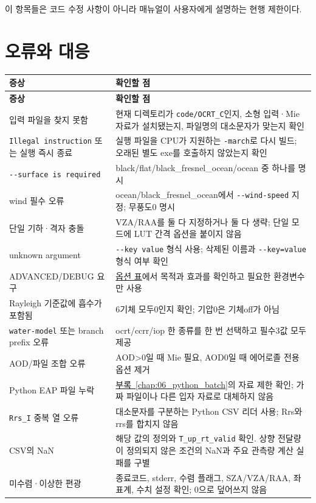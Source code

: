 이 항목들은 코드 수정 사항이 아니라 매뉴얼이 사용자에게 설명하는 현행 제한이다.

\section{오류와 대응}
\label{sec:auto:07_validation_notes:3}

{\TableFont
\begin{longtable}{@{}>{\raggedright\arraybackslash}p{}>{\raggedright\arraybackslash}p{}@{}}
\toprule
\textbf{증상} & \textbf{확인할 점} \\
\midrule
\endfirsthead
\toprule
\textbf{증상} & \textbf{확인할 점} \\
\midrule
\endhead
\bottomrule
\endfoot
입력 파일을 찾지 못함 & 현재 디렉토리가 \texttt{code/\allowbreak{}OCRT\_\allowbreak{}C}인지, 소형 입력·Mie 자료가 설치됐는지, 파일명의 대소문자가 맞는지 확인 \\
\texttt{Illegal instruct\allowbreak{}ion} 또는 실행 즉시 종료 & 실행 파일을 CPU가 지원하는 \texttt{-\allowbreak{}march}로 다시 빌드; 오래된 별도 exe를 호출하지 않았는지 확인 \\
\texttt{-\allowbreak{}-\allowbreak{}surface is requi\allowbreak{}red} & black/flat/black\_fresnel\_ocean/ocean 중 하나를 명시 \\
wind 필수 오류 & ocean/black\_fresnel\_ocean에서 \texttt{-\allowbreak{}-\allowbreak{}wind-\allowbreak{}speed} 지정; 무풍도0 명시 \\
단일 기하·격자 충돌 & VZA/RAA를 둘 다 지정하거나 둘 다 생략; 단일 모드에 LUT 간격 옵션을 붙이지 않음 \\
unknown argument & \texttt{-\allowbreak{}-\allowbreak{}key value} 형식 사용; 삭제된 이름과 \texttt{-\allowbreak{}-\allowbreak{}key=\allowbreak{}value} 형식 여부 확인 \\
ADVANCED/DEBUG 요구 & \hyperref[chap:03_options]{옵션 표}에서 목적과 효과를 확인하고 필요한 환경변수만 사용 \\
Rayleigh 기준값에 흡수가 포함됨 & 6기체 모두0인지 확인; 기압0은 기체off가 아님 \\
\texttt{water-\allowbreak{}model} 또는 branch prefix 오류 & ocrt/ccrr/iop 한 종류를 한 번 선택하고 필수3값 모두 제공 \\
AOD/파일 조합 오류 & AOD>0일 때 Mie 필요, AOD0일 때 에어로졸 전용 옵션 제거 \\
Python EAP 파일 누락 & \hyperref[chap:06_python_batch]{부록~\ref*{chap:06_python_batch}}의 자료 제한 확인; 가짜 파일이나 다른 입자 자료로 대체하지 않음 \\
\texttt{Rrs\_\allowbreak{}I} 중복 열 오류 & 대소문자를 구분하는 Python CSV 리더 사용; Rrs와rrs를 합치지 않음 \\
CSV의 NaN & 해당 값의 정의와 \texttt{T\_\allowbreak{}up\_\allowbreak{}rt\_\allowbreak{}valid} 확인. 상향 전달량이 정의되지 않은 조건의 NaN과 주요 관측량 계산 실패를 구별 \\
미수렴·이상한 편광 & 종료코드, stderr, 수렴 플래그, SZA/VZA/RAA, 좌표계, 수치 설정 확인; 0으로 덮어쓰지 않음 \\
\end{longtable}
}

